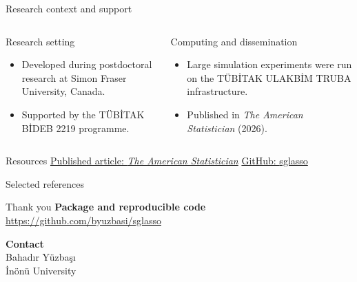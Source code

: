 \documentclass[newPxFont,nosectionpage]{beamer}
\newcommand{\pkg}[1]{{\normalfont\fontseries{b}\selectfont #1}}
\begin{document}
\begin{frame}{Research context and support}
\footnotesize
\begin{columns}[T,onlytextwidth]
\begin{block}{Research setting}
\begin{itemize}
  \item Developed during postdoctoral research at Simon Fraser University, Canada.
  \item Supported by the T\"{U}B\.{I}TAK B\.{I}DEB 2219 programme.
\end{itemize}
\end{block}
\begin{block}{Computing and dissemination}
\begin{itemize}
  \item Large simulation experiments were run on the T\"{U}B\.{I}TAK ULAKB\.{I}M TRUBA infrastructure.
  \item Published in \emph{The American Statistician} (2026).
\end{itemize}
\end{block}
\end{columns}
\vspace{0.4em}
\begin{alertblock}{Resources}
\href{https://doi.org/10.1080/00031305.2026.2709494}{Published article: \emph{The American Statistician}} \qquad
\href{https://github.com/byuzbasi/sglasso}{GitHub: \pkg{sglasso}}
\end{alertblock}
\end{frame}

\begin{frame}{Selected references}
\tiny


\end{frame}

\begin{frame}{Thank you}
\Large
\textbf{Package and reproducible code}\\[0.5em]
\normalsize
\url{https://github.com/byuzbasi/sglasso}

\vspace{1.25em}
\textbf{Contact}\\[0.5em]
\normalsize
Bahad{\i}r Y\"{u}zba\c{s}{\i}\\
\.{I}n\"{o}n\"{u} University
\end{frame}
\end{document}
